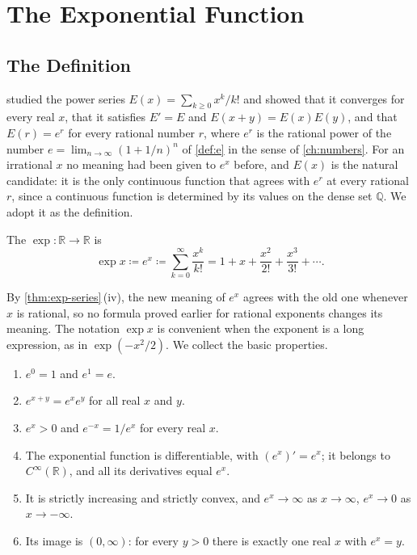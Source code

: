 \section{The Exponential Function}
\label{sec:exp-function}

\subsection{The Definition}

 studied the power series $E(x)=\sum_{k\ge0}x^k/k!$ and showed that it converges for every real $x$, that it satisfies $E'=E$ and $E(x+y)=E(x)E(y)$, and that $E(r)=e^r$ for every rational number $r$, where $e^r$ is the rational power of the number $e=\lim_{n\to\infty}(1+1/n)^n$ of \cref{def:e} in the sense of \cref{ch:numbers}. For an irrational $x$ no meaning had been given to $e^x$ before, and $E(x)$ is the natural candidate: it is the only continuous function that agrees with $e^r$ at every rational $r$, since a continuous function is determined by its values on the dense set $\mathbb Q$. We adopt it as the definition.

\begin{definition}
\label{def:exp}
The  $\exp\colon\mathbb R\to\mathbb R$ is
\[
\exp x\coloneqq e^x\coloneqq\sum_{k=0}^\infty\frac{x^k}{k!}=1+x+\frac{x^2}{2!}+\frac{x^3}{3!}+\cdots .
\]
\end{definition}

By \cref{thm:exp-series}\,(iv), the new meaning of $e^x$ agrees with the old one whenever $x$ is rational, so no formula proved earlier for rational exponents changes its meaning. The notation $\exp x$ is convenient when the exponent is a long expression, as in $\exp(-x^2/2)$. We collect the basic properties.

\begin{theorem}
\label{thm:exp-properties}
\leavevmode
\begin{enumerate}
\item $e^0=1$ and $e^1=e$.
\item $e^{x+y}=e^xe^y$ for all real $x$ and $y$.
\item $e^x>0$ and $e^{-x}=1/e^x$ for every real $x$.
\item The exponential function is differentiable, with $(e^x)'=e^x$; it belongs to $C^\infty(\mathbb R)$, and all its derivatives equal $e^x$.
\item It is strictly increasing and strictly convex, and $e^x\to\infty$ as $x\to\infty$, $e^x\to0$ as $x\to-\infty$.
\item Its image is $(0,\infty)$: for every $y>0$ there is exactly one real $x$ with $e^x=y$.
\end{enumerate}
\end{theorem}


